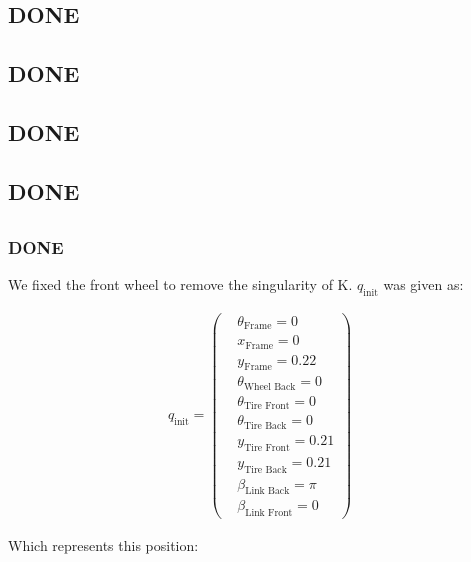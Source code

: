    \subsection{DONE}
\subsection{DONE}
\subsection{DONE}
\subsection{DONE}
\subsection{}
\subsubsection{DONE}
We fixed the front wheel to remove the singularity of K. $q_{\text{init}}$  was given as:

\begin{equation}\label{eq:4.5.1}
    \begin{split}
        q_{\text{init}} = 
        \begin{pmatrix}
            &\theta_{\text{Frame}} = 0\\
            &x_{\text{Frame}} = 0\\
            &y_{\text{Frame}} = 0.22\\
            &\theta_{\text{Wheel Back}} = 0\\
            &\theta_{\text{Tire Front}} = 0\\
            &\theta_{\text{Tire Back}} = 0\\
            &y_{\text{Tire Front}} = 0.21\\
            &y_{\text{Tire Back}} = 0.21\\
            &\beta_{\text{Link Back}} = \pi\\
            &\beta_{\text{Link Front}} = 0
        \end{pmatrix}
    \end{split}
\end{equation}

Which represents this position:

